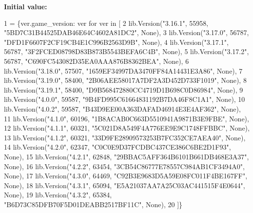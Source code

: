 {\bfseries Initial value\+:}
\begin{DoxyCode}
1 =  \{ver.game\_version: ver \textcolor{keywordflow}{for} ver \textcolor{keywordflow}{in} [
2     lib.Version(\textcolor{stringliteral}{"3.16.1"}, 55958, \textcolor{stringliteral}{"5BD7C31B44525DAB46E64C4602A81DC2"}, \textcolor{keywordtype}{None}),
3     lib.Version(\textcolor{stringliteral}{"3.17.0"}, 56787, \textcolor{stringliteral}{"DFD1F6607F2CF19CB4E1C996B2563D9B"}, \textcolor{keywordtype}{None}),
4     lib.Version(\textcolor{stringliteral}{"3.17.1"}, 56787, \textcolor{stringliteral}{"3F2FCED08798D83B873B5543BEFA6C4B"}, \textcolor{keywordtype}{None}),
5     lib.Version(\textcolor{stringliteral}{"3.17.2"}, 56787, \textcolor{stringliteral}{"C690FC543082D35EA0AAA876B8362BEA"}, \textcolor{keywordtype}{None}),
6     lib.Version(\textcolor{stringliteral}{"3.18.0"}, 57507, \textcolor{stringliteral}{"1659EF34997DA3470FF84A14431E3A86"}, \textcolor{keywordtype}{None}),
7     lib.Version(\textcolor{stringliteral}{"3.19.0"}, 58400, \textcolor{stringliteral}{"2B06AEE58017A7DF2A3D452D733F1019"}, \textcolor{keywordtype}{None}),
8     lib.Version(\textcolor{stringliteral}{"3.19.1"}, 58400, \textcolor{stringliteral}{"D9B568472880CC4719D1B698C0D86984"}, \textcolor{keywordtype}{None}),
9     lib.Version(\textcolor{stringliteral}{"4.0.0"}, 59587, \textcolor{stringliteral}{"9B4FD995C61664831192B7DA46F8C1A1"}, \textcolor{keywordtype}{None}),
10     lib.Version(\textcolor{stringliteral}{"4.0.2"}, 59587, \textcolor{stringliteral}{"B43D9EE00A363DAFAD46914E3E4AF362"}, \textcolor{keywordtype}{None}),
11     lib.Version(\textcolor{stringliteral}{"4.1.0"}, 60196, \textcolor{stringliteral}{"1B8ACAB0C663D5510941A9871B3E9FBE"}, \textcolor{keywordtype}{None}),
12     lib.Version(\textcolor{stringliteral}{"4.1.1"}, 60321, \textcolor{stringliteral}{"5C021D8A549F4A776EE9E9C1748FFBBC"}, \textcolor{keywordtype}{None}),
13     lib.Version(\textcolor{stringliteral}{"4.1.2"}, 60321, \textcolor{stringliteral}{"33D9FE28909573253B7FC352CE7AEA40"}, \textcolor{keywordtype}{None}),
14     lib.Version(\textcolor{stringliteral}{"4.2.0"}, 62347, \textcolor{stringliteral}{"C0C0E9D37FCDBC437CE386C6BE2D1F93"}, \textcolor{keywordtype}{None}),
15     lib.Version(\textcolor{stringliteral}{"4.2.1"}, 62848, \textcolor{stringliteral}{"29BBAC5AFF364B6101B661DB468E3A37"}, \textcolor{keywordtype}{None}),
16     lib.Version(\textcolor{stringliteral}{"4.2.2"}, 63454, \textcolor{stringliteral}{"3CB54C86777E78557C984AB1CF3494A0"}, \textcolor{keywordtype}{None}),
17     lib.Version(\textcolor{stringliteral}{"4.3.0"}, 64469, \textcolor{stringliteral}{"C92B3E9683D5A59E08FC011F4BE167FF"}, \textcolor{keywordtype}{None}),
18     lib.Version(\textcolor{stringliteral}{"4.3.1"}, 65094, \textcolor{stringliteral}{"E5A21037AA7A25C03AC441515F4E0644"}, \textcolor{keywordtype}{None}),
19     lib.Version(\textcolor{stringliteral}{"4.3.2"}, 65384, \textcolor{stringliteral}{"B6D73C85DFB70F5D01DEABB2517BF11C"}, \textcolor{keywordtype}{None}),
20 ]\}
\end{DoxyCode}
